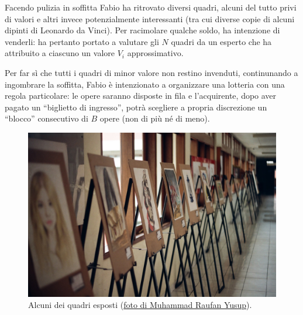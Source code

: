 \usepackage{xcolor}
\usepackage{afterpage}
\usepackage{pifont,mdframed}
\usepackage[bottom]{footmisc}

\makeatletter
\gdef\this@inputfilename{input}
\gdef\this@outputfilename{output}
\makeatother

\newcommand{\funcitem}[2]{\item[$\blacksquare$] \textbf{\large \textsf{Funzione} \texttt{#1}} \vspace{-0.3cm} \begin{center}\begin{tabularx}{\textwidth}{|c|X|} \hline #2 \hline \end{tabularx}\end{center}}

Facendo pulizia in soffitta Fabio ha ritrovato diversi quadri, alcuni del tutto privi di valori e altri invece potenzialmente interessanti (tra cui diverse copie di alcuni dipinti di Leonardo da Vinci). Per racimolare qualche soldo, ha intenzione di venderli: ha pertanto portato a valutare gli $N$ quadri da un esperto che ha attribuito a ciascuno un valore $V_i$ approssimativo.

Per far sì che tutti i quadri di minor valore non restino invenduti, continunando a ingombrare la soffitta, Fabio è intenzionato a organizzare una lotteria con una regola particolare: le opere saranno disposte in fila e l'acquirente, dopo aver pagato un ``biglietto di ingresso'', potrà scegliere a propria discrezione un ``blocco'' consecutivo di $B$ opere (non di più né di meno). 

\begin{figure}[H]
  \begin{center}
        \includegraphics[width=0.7\linewidth]{quadri.jpg}
    \caption{Alcuni dei quadri esposti (\href{https://unsplash.com/photos/9JEYfqLj-H0}{foto di Muhammad Raufan Yusup}).}
  \end{center}
\end{figure}

